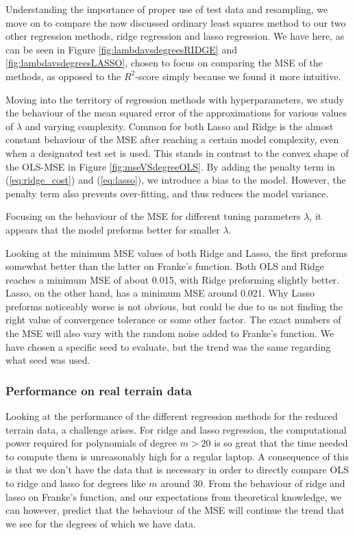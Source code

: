 Understanding the importance of proper use of test data and resampling, we move on to compare the now discussed ordinary least squares method to our two other regression methods, ridge regression and lasso regression. We have here, as can be seen in Figure \ref{fig:lambdavsdegreesRIDGE} and \ref{fig:lambdavsdegreesLASSO}, chosen to focus on comparing the MSE of the methods, as opposed to the $R^2$-score simply because we found it more intuitive.

Moving into the territory of regression methods with hyperparameters, we study the behaviour of the mean squared error of the approximations for various values of $\lambda$ and varying complexity.
Common for both Lasso and Ridge is the almost constant behaviour of the MSE after reaching a certain model complexity, even when a designated test set is used. This stands in contrast to the convex shape of the OLS-MSE in Figure \ref{fig:mseVSdegreeOLS}. By adding the penalty term in (\ref{eq:ridge_cost}) and (\ref{eq:lasso}), we introduce a bias to the model. However, the penalty term also prevents over-fitting, and thus reduces the model variance.

Focusing on the behaviour of the MSE for different tuning parameters $\lambda$, it appears that the model preforms better for smaller $\lambda$.

Looking at the minimum MSE values of both Ridge and Lasso, the first preforms somewhat better than the latter on Franke's function. Both OLS and Ridge reaches a minimum MSE of about 0.015, with Ridge preforming slightly better. Lasso, on the other hand, has a minimum MSE around 0.021. Why Lasso preforms noticeably worse is not obvious, but could be due to us not finding the right value of convergence tolerance or some other factor. The exact numbers of the MSE will also vary with the random noise added to Franke's function. We have chosen a specific seed to evaluate, but the trend was the same regarding what seed was used.


\subsubsection*{Performance on real terrain data}
Looking at the performance of the different regression methods for the reduced terrain data, a challenge arises. For ridge and lasso regression, the computational power required for polynomials of degree $m > 20$ is so great that the time needed to compute them is unreasonably high for a regular laptop. A consequence of this is that we don't have the data that is necessary in order to directly compare OLS to ridge and lasso for degrees like $m$ around 30. From the behaviour of ridge and lasso on Franke's function, and our expectations from theoretical knowledge, we can however, predict that the behaviour of the MSE will continue the trend that we see for the degrees of which we have data.

